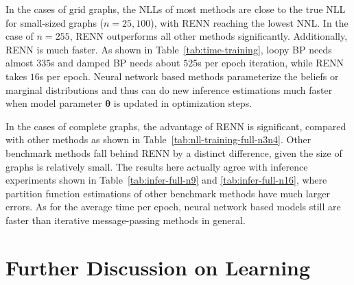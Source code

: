 In the cases of grid graphs, the NLLs of most methods are close to the true NLL for small-sized graphs ($n=25,100$), with RENN reaching the lowest NNL. In the case of $n=255$, RENN outperforms all other methods significantly. Additionally, RENN is much faster. As shown in Table~\ref{tab:time-training}, loopy BP needs almost $335$s and damped BP needs about $525$s per epoch iteration, while RENN takes $16$s per epoch.
Neural network based methods parameterize the beliefs or marginal distributions and thus can do new inference estimations much faster when model parameter $\bm{\theta}$ is updated in optimization steps. %



In the cases of complete graphs, the advantage of RENN is significant, compared with other methods as shown in Table~\ref{tab:nll-training-full-n3n4}. Other benchmark methods fall behind RENN by a distinct difference, given the size of graphs is relatively small. The results here actually agree with inference experiments shown in Table~\ref{tab:infer-full-n9} and \ref{tab:infer-full-n16}, where partition function estimations of other benchmark methods have much larger errors. As for the average time per epoch, neural network based models still are faster than iterative message-passing methods in general.


\section{Further Discussion on Learning}\label{chpt5:sec:futher-dis-learning}

